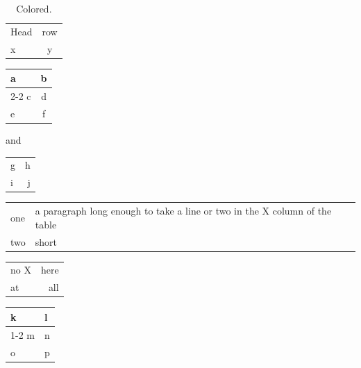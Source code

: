 \documentclass{article}
\begin{document}
\begin{longtable}{lc}
\rowcolor{green!10}\caption{Colored.}\\
\hline\hline
\rowcolor{blue!10}
Head & row \\
\hline
x & y \\
\end{longtable}

\begin{tabular}{|l|c|}
\hline
a & b \\
\cline{2-2}
c & d \\
e & f
\end{tabular} and \begin{tabular}{lr}
g & h \\
i & j \\
\end{tabular}

\noindent\begin{tabularx}{\linewidth}{lX}
one & a paragraph long enough to take a line or two in the X column of the table \\
two & short \\
\end{tabularx}

\noindent\begin{tabularx}{\linewidth}{lr}
no X & here \\
at & all \\
\end{tabularx}

\begin{tabular}{ll}
k & l \\
\cmidrule{1-2}
m & n \\
o & p \\
\end{tabular}
\end{document}
